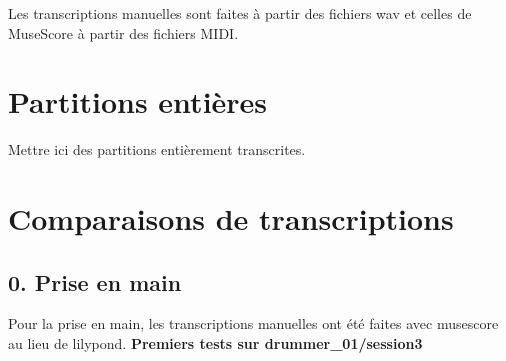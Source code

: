 Les transcriptions manuelles sont faites à partir des fichiers wav et celles de MuseScore à partir des fichiers MIDI.\\
\section{Partitions entières}
Mettre ici des partitions entièrement transcrites.
\section{Comparaisons de transcriptions}
\subsection*{0. Prise en main}
Pour la prise en main, les transcriptions manuelles ont été faites avec musescore au lieu de lilypond.
\textbf{Premiers tests sur drummer\_01/session3}\\

